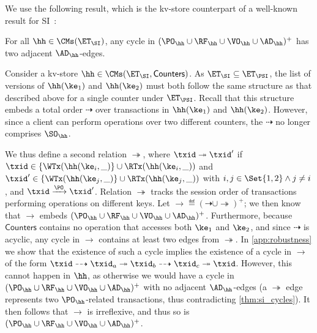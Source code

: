 We use the following result, which is the kv-store counterpart of a well-known result for SI~\cite{fekete-tods,SIanalysis}: 
\begin{theorem}
\label{thm:si_cycles}
For all $\hh \in \CMs(\ET_{\SI})$, any cycle in $(\PO_{\hh} \cup \RF_{\hh} \cup \VO_{\hh} \cup \AD_{\hh})^+$ has two adjacent $\AD_{\hh}$-edges.
\end{theorem}

Consider a kv-store $\hh \in \CMs(\ET_{\SI}, \mathsf{Counters})$. 
As $\ET_{\SI} \subseteq \ET_{\PSI}$, the list of versions of $\hh(\ke_1)$ and $\hh(\ke_2)$ 
must both follow the same structure as that described above for a single counter under $\ET_{\PSI}$. 
Recall that this structure embeds a total order $\dashrightarrow$ over transactions in $\hh(\ke_1)$ and $\hh(\ke_2)$.
However, since a client can perform operations over two different counters, the $\dashrightarrow$ no longer comprises $\SO_{\hh}$. 

We thus define a second relation $\twoheadrightarrow$, where
$\txid \twoheadrightarrow \txid'$ if $\txid \in \{\WTx(\hh(\ke_{i}, \_)\} \cup \RTx(\hh(\ke_{i}, \_))$ 
and $\txid' \in \{\WTx(\hh(\ke_{j}, \_)\} \cup \RTx(\hh(\ke_{j}, \_))$ with $i,j \in \Set{1,2} \land j \neq i$,  
and $\txid \xrightarrow{\PO} \txid'$.
Relation $\twoheadrightarrow$ tracks the session order of transactions performing operations on different keys. 
Let $\rightarrow \eqdef (\dashrightarrow \cup \twoheadrightarrow)^{+}$; 
we then know that $\rightarrow$ embeds $(\PO_{\hh} \cup \RF_{\hh} \cup \VO_{\hh} \cup \AD_{\hh})^{+}$.
Furthermore, because $\mathsf{Counters}$ contains no operation that accesses both $\ke_1$ and $\ke_2$, and since $\dashrightarrow$ is acyclic, 
any cycle in $\rightarrow$ contains at least two edges from $\twoheadrightarrow$. 
In \cref{app:robustness} we show that the existence of such a cycle implies the 
existence of a cycle in $\rightarrow$ of the form $\txid \dashrightarrow \txid_{a} \twoheadrightarrow 
\txid_{b} \dashrightarrow \txid_{c} \twoheadrightarrow \txid$. 
However, this cannot happen in $\hh$, as otherwise we would have a cycle in $(\PO_{\hh} \cup \RF_{\hh} \cup \VO_{\hh} \cup \AD_{\hh})^{+}$ with no adjacent $\AD_{\hh}$-edges (a $\twoheadrightarrow$ edge represents two  $\PO_{\hh}$-related transactions, 
thus contradicting \cref{thm:si_cycles}). 
It then follows that $\rightarrow$ is irreflexive, and thus so is $(\PO_{\hh} \cup \RF_{\hh} \cup \VO_{\hh} \cup \AD_{\hh})^+$.

